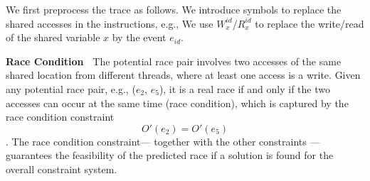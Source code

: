 








We first preprocess the trace as follows. We introduce symbols to replace the shared accesses in the instructions, e.g., We use $W^{id}_{x}$/$R^{id}_{x}$ to replace the write/read of the shared variable $x$ by the event $e_{id}$. %

{\bf Race Condition\ } The potential race pair involves two accesses of the same shared location from different threads, where at least one access is a write. Given any potential race pair, e.g., ($e_2$, $e_5$), it is a real race if and only if the two accesses can occur at the same time (race condition), which is captured by the race condition constraint
$$
	O'(e_2) = O'(e_5)
$$.
The race condition constraint--- together with the other constraints --- guarantees the feasibility of the predicted race if a solution is found for the overall constraint system.

